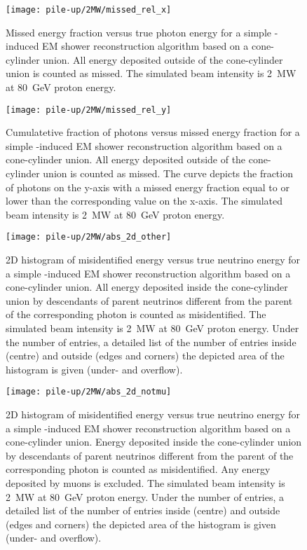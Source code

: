 \begin{figure}[htb]
	\centering
	\texttt{[image: pile-up/2MW/missed\_rel\_x]}
	\caption{Missed energy fraction versus true photon energy for a simple \Pgpz-induced EM shower reconstruction algorithm based on a cone-cylinder union.
		All energy deposited outside of the cone-cylinder union is counted as missed.
		The simulated beam intensity is \SI{2}{\mega\watt} at \SI{80}{\giga\electronvolt} proton energy.}
\end{figure}

\begin{figure}[htb]
	\centering
	\texttt{[image: pile-up/2MW/missed\_rel\_y]}
	\caption{Cumulatetive fraction of photons versus missed energy fraction for a simple \Pgpz-induced EM shower reconstruction algorithm based on a cone-cylinder union.
		All energy deposited outside of the cone-cylinder union is counted as missed.
		The curve depicts the fraction of photons on the y-axis with a missed energy fraction equal to or lower than the corresponding value on the x-axis.
		The simulated beam intensity is \SI{2}{\mega\watt} at \SI{80}{\giga\electronvolt} proton energy.}
\end{figure}

\begin{figure}[htb]
	\centering
	\texttt{[image: pile-up/2MW/abs\_2d\_other]}
	\caption{2D histogram of misidentified energy versus true neutrino energy for a simple \Pgpz-induced EM shower reconstruction algorithm based on a cone-cylinder union.
		All energy deposited inside the cone-cylinder union by descendants of parent neutrinos different from the parent of the corresponding \Pgpz photon is counted as misidentified.
		The simulated beam intensity is \SI{2}{\mega\watt} at \SI{80}{\giga\electronvolt} proton energy.
		Under the number of entries, a detailed list of the number of entries inside (centre) and outside (edges and corners) the depicted area of the histogram is given (under- and overflow).}
\end{figure}

\begin{figure}[htb]
	\centering
	\texttt{[image: pile-up/2MW/abs\_2d\_notmu]}
	\caption{2D histogram of misidentified energy versus true neutrino energy for a simple \Pgpz-induced EM shower reconstruction algorithm based on a cone-cylinder union.
		Energy deposited inside the cone-cylinder union by descendants of parent neutrinos different from the parent of the corresponding \Pgpz photon is counted as misidentified.
		Any energy deposited by muons is excluded.
		The simulated beam intensity is \SI{2}{\mega\watt} at \SI{80}{\giga\electronvolt} proton energy.
		Under the number of entries, a detailed list of the number of entries inside (centre) and outside (edges and corners) the depicted area of the histogram is given (under- and overflow).}
\end{figure}

